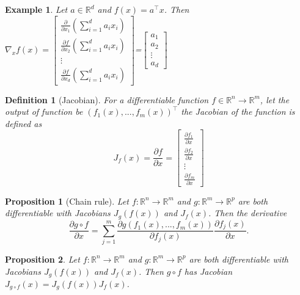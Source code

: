 \documentclass{article}
\newtheorem{definition}{Definition}
\newtheorem{example}{Example}
\newtheorem{proposition}{Proposition}
\newcommand{\R}{\mathbb{R}}
\DeclareMathOperator*{\1}{\mathbbm{1}}
\theoremstyle{definition}
\theoremstyle{remark}
\begin{document}
  \begin{example}
    Let $a\in \R^d$ and $f(x)=a^\top x$. Then $\nabla_x f(x) = \begin{bmatrix}
        \frac{\partial }{\partial x_1}\left(\sum_{i=1}^d a_ix_i\right)\\
        \frac{\partial f}{\partial x_2}\left(\sum_{i=1}^d a_ix_i\right)\\
        \vdots\\
        \frac{\partial f}{\partial x_d}\left(\sum_{i=1}^d a_ix_i\right)
    \end{bmatrix}$=$\begin{bmatrix}
        a_1\\
        a_2\\
        \vdots\\
        a_d\end{bmatrix}$
  \end{example}
  \begin{definition}[Jacobian]
    For a differentiable function $f\in \R^n\to\R^m$, let the output of function be $(f_1(x),...,f_m(x))^\top$ the Jacobian of the function is defined as 
    \begin{equation*}
        J_f(x)=\frac{\partial f}{\partial x}=\begin{bmatrix}
            \frac{\partial f_1}{\partial x}\\
            \frac{\partial f_2}{\partial x}\\
            \vdots\\
            \frac{\partial f_m}{\partial x}
        \end{bmatrix}
    \end{equation*}
  \end{definition}
  \begin{proposition}[Chain rule]
    Let $f:\R^n\to\R^m$ and $g:\R^m\to\R^p$ are both differentiable with Jacobians $J_g(f(x))$ and $J_f(x)$. Then the derivative 
    \begin{equation*}
        \frac{\partial g\circ f}{\partial x}=\sum_{j=1}^m \frac{\partial g(f_1(x),...,f_m(x))}{\partial f_j(x)}\frac{\partial f_j(x)}{\partial x}.
    \end{equation*}
  \end{proposition}
  \begin{proposition}
    Let $f:\R^n\to\R^m$ and $g:\R^m\to\R^p$ are both differentiable with Jacobians $J_g(f(x))$ and $J_f(x)$. Then $g\circ f$ has Jacobian $J_{g\circ f}(x)=J_g(f(x))J_f(x)$.
  \end{proposition}
\end{document}
